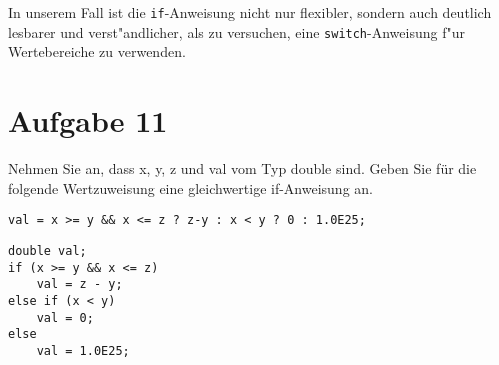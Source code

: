 \documentclass[10pt, oneside]{article}
\begin{document}
In unserem Fall ist die \verb|if|-Anweisung nicht nur flexibler, sondern auch
deutlich lesbarer und verst"andlicher, als zu versuchen, eine
\verb|switch|-Anweisung f"ur Wertebereiche zu verwenden.

\section{Aufgabe 11}

Nehmen Sie an, dass x, y, z und val vom Typ double sind. Geben Sie für die
folgende Wertzuweisung eine gleichwertige if-Anweisung an.

\verb|val = x >= y && x <= z ? z-y : x < y ? 0 : 1.0E25;|

\begin{verbatim}
double val;
if (x >= y && x <= z)
    val = z - y;
else if (x < y)
    val = 0;
else
    val = 1.0E25;
\end{verbatim}
\end{document}
